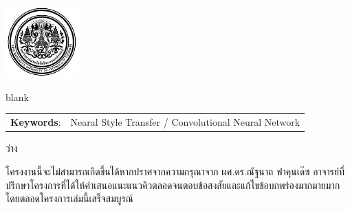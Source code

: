 \documentclass[12pt,oneside,openright,a4paper]{cpe-thai-project}
\begin{document}
\pdfstringdefDisableCommands{%
\let\MakeUppercase\relax
}

\begin{center}
\includegraphics[width=2.8cm]{logo02.jpg}
\end{center}
\vspace*{-1cm}

\maketitlepage
\makesignaturepage 

\abstract


blank

\begin{flushleft}
\begin{tabular*}{\textwidth}{@{}lp{}}
\textbf{Keywords}: & Nearal Style Transfer / Convolutional Neural Network
\end{tabular*}
\end{flushleft}
\endabstract

\thaiabstract

ว่าง


\endabstract


\preface
โครงงานนี้จะไม่สามารถเกิดขึ้นได้หากปราศจากความกรุณาจาก ผศ.ดร.ณัฐนาถ ฟาคุนเด๊ซ อาจารย์ที่ปรึกษาโครงการที่ได้ให้คำเสนอแนะแนวคิวตลอดจนตอบข้อสงสัยและแก้ไขข้อบกพร่องมากมายมากโดยตลอดโครงการเล่มนี้เสร็จสมบูรณ์
\end{document}
